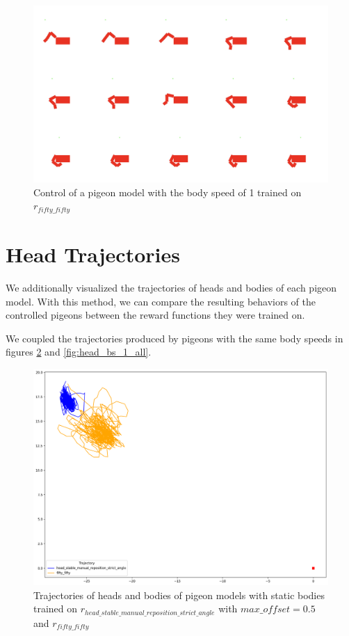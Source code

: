  \begin{figure}[H]
      \centering
      \includegraphics[width=1\textwidth]{figures/frames/frames_005.png}
      \caption{Control of a pigeon model with the body speed of 1 trained on $r_{fifty\_fifty}$}
      \label{fig:fifty_fifty_body_speed_1}
  \end{figure}

\section{Head Trajectories}
  We additionally visualized the trajectories of heads and bodies of each pigeon model. With this method, we can compare the resulting behaviors of the controlled pigeons between the reward functions they were trained on.

  We coupled the trajectories produced by pigeons with the same body speeds in figures \ref{fig:head_bs_0} and \ref{fig:head_bs_1_all}.

  \begin{figure}[H]
      \centering
      \includegraphics[width=1\textwidth]{figures/head_tracking_results/pigeon_bs_0.png}
      \caption{Trajectories of heads and bodies of pigeon models with static bodies trained on $r_{head\_stable\_manual\_reposition\_strict\_angle}$ with $max\_offset = 0.5$ and $r_{fifty\_fifty}$}
      \label{fig:head_bs_0}
  \end{figure}

